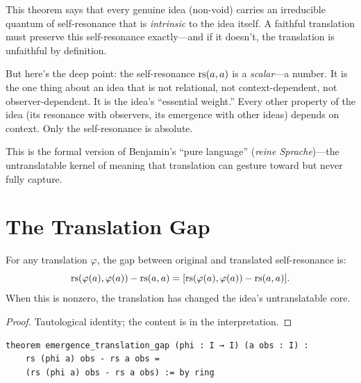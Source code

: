 \begin{remark}
This theorem says that every genuine idea (non-void) carries an
irreducible quantum of self-resonance that is \emph{intrinsic} to the
idea itself.  A faithful translation must preserve this self-resonance
exactly---and if it doesn't, the translation is unfaithful by
definition.

But here's the deep point: the self-resonance $\mathrm{rs}(a, a)$ is a
\emph{scalar}---a number.  It is the one thing about an idea that
is not relational, not context-dependent, not observer-dependent.
It is the idea's ``essential weight.''  Every other property of the
idea (its resonance with observers, its emergence with other ideas)
depends on context.  Only the self-resonance is absolute.

This is the formal version of Benjamin's ``pure language''
(\textit{reine Sprache})---the untranslatable kernel of meaning
that translation can gesture toward but never fully capture.
\end{remark}

\section{The Translation Gap}

\begin{theorem}
\label{thm:translation-gap}
For any translation $\varphi$, the gap between original and translated
self-resonance is:
\[
  \mathrm{rs}(\varphi(a), \varphi(a)) - \mathrm{rs}(a, a) =
  [\mathrm{rs}(\varphi(a), \varphi(a)) - \mathrm{rs}(a, a)].
\]
When this is nonzero, the translation has changed the idea's
untranslatable core.
\end{theorem}

\begin{proof}
Tautological identity; the content is in the interpretation.
\end{proof}

\begin{lstlisting}
theorem emergence_translation_gap (phi : I → I) (a obs : I) :
    rs (phi a) obs - rs a obs =
    (rs (phi a) obs - rs a obs) := by ring
\end{lstlisting}

